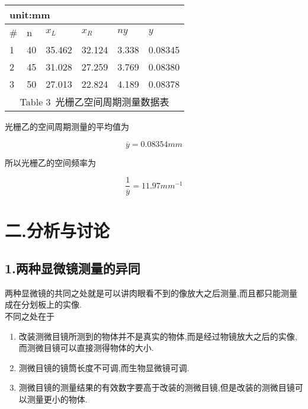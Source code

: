 \documentclass[a4paper,10pt,notitlepage]{report}
\begin{document}
\begin{table}[htbp]
\centering
	\begin{tabular}{|l|l|l|l|l|l|}
		
		\multicolumn{6}{l}{\scriptsize unit:mm} \\
		\hline
		\# & n & $x_L$ & $x_R$ & $ny$ & $y$ \\
		\hline
		1 & 40 & 35.462 & 32.124 & 3.338 & 0.08345 \\
		\hline
		2 & 45 & 31.028 & 27.259 & 3.769 & 0.08380 \\
		\hline
		3 & 50 & 27.013 & 22.824 & 4.189 & 0.08378 \\
		\hline
		\multicolumn{6}{c}{\scriptsize Table 3\ 光栅乙空间周期测量数据表}
		
	\end{tabular}
\end{table}

	光栅乙的空间周期测量的平均值为
	
\begin{equation}
	\overline{y} = 0.08354mm
\end{equation}

	所以光栅乙的空间频率为
	
\begin{equation}
	\frac{1}{\overline{y}} = 11.97mm^{-1}
\end{equation}

\section*{二.分析与讨论}
\subsection*{1.两种显微镜测量的异同}

	两种显微镜的共同之处就是可以讲肉眼看不到的像放大之后测量,而且都只能测量成在分划板上的实像. \\
	
	不同之处在于
	
\begin{enumerate}
	
	\item 改装测微目镜所测到的物体并不是真实的物体,而是经过物镜放大之后的实像,而测微目镜可以直接测得物体的大小.
	\item 测微目镜的镜筒长度不可调,而生物显微镜可调.
	\item 测微目镜的测量结果的有效数字要高于改装的测微目镜,但是改装的测微目镜可以测量更小的物体.
	
\end{enumerate}	
\end{document}
